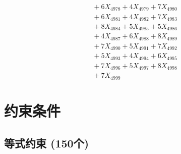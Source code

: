 \documentclass[a4paper,10pt]{article}
\begin{document}
{\begin{align}
&\;  + 6 X_{4978} + 4 X_{4979} + 7 X_{4980} \\[0.3ex]
&\;  + 6 X_{4981} + 4 X_{4982} + 7 X_{4983} \\[0.3ex]
&\;  + 8 X_{4984} + 5 X_{4985} + 5 X_{4986} \\[0.3ex]
&\;  + 4 X_{4987} + 6 X_{4988} + 8 X_{4989} \\[0.5ex]\allowbreak
&\;  + 7 X_{4990} + 5 X_{4991} + 7 X_{4992} \\[0.3ex]
&\;  + 5 X_{4993} + 4 X_{4994} + 6 X_{4995} \\[0.3ex]
&\;  + 7 X_{4996} + 5 X_{4997} + 8 X_{4998} \\[0.3ex]
&\;  + 7 X_{4999}\nonumber
\end{align}
}

\section{约束条件}

\subsection{等式约束 (150个)}
\end{document}
